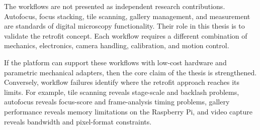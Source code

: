 The workflows are not presented as independent research contributions. Autofocus, focus stacking, tile scanning, gallery management, and measurement are standards of digital microscopy functionality. Their role in this thesis is to validate the retrofit concept. Each workflow requires a different combination of mechanics, electronics, camera handling, calibration, and motion control.

If the platform can support these workflows with low-cost hardware and parametric mechanical adapters, then the core claim of the thesis is strengthened. Conversely, workflow failures identify where the retrofit approach reaches its limits. For example, tile scanning reveals stage-scale and backlash problems, autofocus reveals focus-score and frame-analysis timing problems, gallery performance reveals memory limitations on the Raspberry Pi, and video capture reveals bandwidth and pixel-format constraints.
